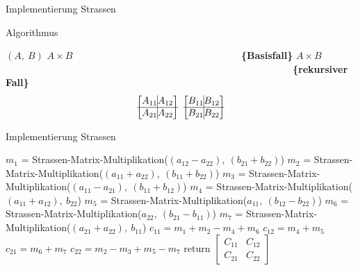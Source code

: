 \documentclass{beamer}
\begin{document}
	\begin{frame}{Implementierung Strassen}
		\begin{algorithm}[H]
			{Algorithmus}
			\caption[Strassen-Matrix-Multiplikation]{Strassen-Matrix-Multiplikation}
			\begin{algorithmic}[1]
				\Require $(A, \ B)$
				\Ensure $A \times B$
				  \ \ \ \ \ \ \ \ \ \ \ \ \ \ \ \ \ \ \ \ \ \ \ \ \ \ \ \ \ \ \ \ \ \ \textbf{\{Basisfall\}}
				\State $A \times B$
				\Else  \ \ \ \ \ \ \ \ \ \ \ \ \ \ \ \ \ \ \ \ \ \ \ \ \ \ \ \ \ \ \ \ \ \ \ \ \ \ \ \ \ \ \ \ \ \ \ \ \ \ \ \ \ \ \ \ \ \ \ \textbf{\{rekursiver Fall\}}
				\State $$
				\begin{bmatrix}
					A_{11} \vline A_{12}\\ \hline
					A_{21} \vline A_{22} 
				\end{bmatrix}
				\
				\begin{bmatrix}
					B_{11} \vline B_{12}\\ \hline
					B_{21} \vline B_{22}
				\end{bmatrix}
				$$
				
			\end{algorithmic}
		\end{algorithm} 
	\end{frame}

	\begin{frame}{Implementierung Strassen}
		\begin{algorithm}[H]
			\begin{algorithmic}[1]
				\State $m_1$ = Strassen-Matrix-Multiplikation($(a_{12} - a_{22}) ,\ (b_{21} + b_{22})$)
				\State $m_2$ = Strassen-Matrix-Multiplikation($(a_{11} + a_{22}) ,\ (b_{11} + b_{22})$)
				\State $m_3$ = Strassen-Matrix-Multiplikation($(a_{11} - a_{21}) ,\ (b_{11} + b_{12})$)
				\State $m_4$ = Strassen-Matrix-Multiplikation($(a_{11} + a_{12}) ,\ b_{22}$)
				\State $m_5$ = Strassen-Matrix-Multiplikation($a_{11} ,\ (b_{12} - b_{22})$)
				\State $m_6$ = Strassen-Matrix-Multiplikation($a_{22} ,\ (b_{21} - b_{11})$)
				\State $m_7$ = Strassen-Matrix-Multiplikation($(a_{21} + a_{22}) ,\ b_{11}$)
				\State $c_{11} = m_{1} + m_{2} - m_{4} + m_{6}$
				\State $c_{12} = m_{4} + m_{5}$
				\State $c_{21} = m_{6} + m_{7}$
				\State $c_{22} = m_{2} - m_{3} + m_{5} - m_{7}$
				\State return 
				$\begin{bmatrix}
					C_{11} & C_{12}\\
					C_{21} & C_{22}
				\end{bmatrix}$
				\EndIf
			\end{algorithmic}
		\end{algorithm} 
	\end{frame}
		 
\end{document}
